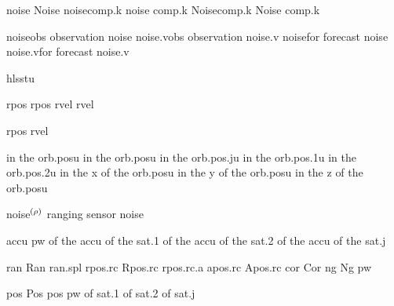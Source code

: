 \begin{acronym}[---------------]
						{\acs{noise}}							{Noise}
			{\acs{noise}\acs{comp.k}}	{\acl{noise} \acl{comp.k}}
			{\acs{Noise}\acs{comp.k}}	{\acl{Noise} \acl{comp.k}}

				{\acs{noise}\acs{obs}}		{observation \acl{noise}} 	%
			{\acs{noise.v}\acs{obs}}	{observation \acl{noise.v}}	%
				{\acs{noise}\acs{for}}		{forecast \acl{noise}}		%
			{\acs{noise.v}\acs{for}}	{forecast \acl{noise.v}}	%

				{hlsstu}

						{rpos}
					{rpos}
						{rvel}
					{rvel}

				{rpos}
				{rvel}

						{ in the }		{orb.posu}
					{ in the }		{orb.posu}
					{ in the }		{orb.pos.ju}
					{ in the }		{orb.pos.1u}
					{ in the }		{orb.pos.2u}
						{ in the }		{x}				{ of the }		{orb.posu}
						{ in the }		{y}				{ of the }		{orb.posu}
						{ in the }		{z}				{ of the }		{orb.posu}

			{\acs{noise}$^{\rm {\left(\rho\right)}}$}	{ranging sensor \acl{noise}}

					{accu}
		{pw}
					{ of the } 		{accu}		{ of the } 		{sat.1}
					{ of the } 		{accu}		{ of the } 		{sat.2}
					{ of the } 		{accu}		{ of the } 		{sat.j}

						{ran}
						{Ran}
						{ran.spl}
						{rpos.rc}
						{Rpos.rc}
						{rpos.rc.a}
						{apos.rc}
						{Apos.rc}
						{cor}
						{Cor}
						{ng}
						{Ng}
				{pw}

						{pos}
						{Pos}
					{pos}
			{pw}
				{ of }			{sat.1}
				{ of }			{sat.2}
				{ of }			{sat.j}


\end{acronym}
